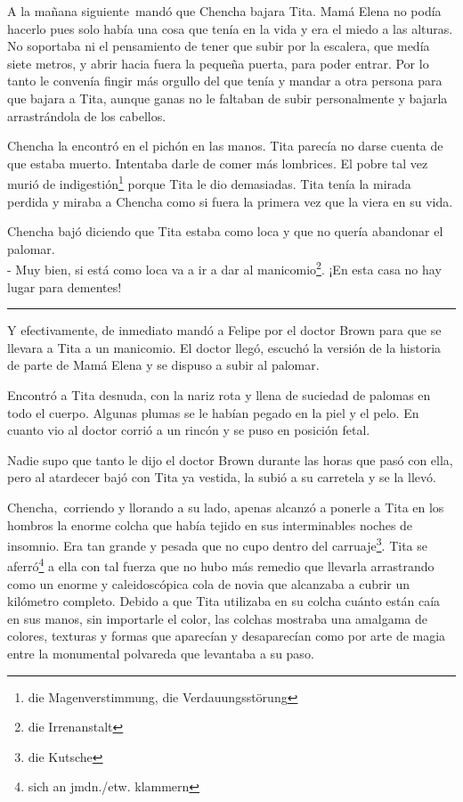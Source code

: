 A la mañana siguiente~mandó que Chencha bajara Tita. Mamá Elena
no podía hacerlo pues solo había una cosa que tenía en la vida y era el
miedo a las alturas. No soportaba ni el pensamiento de tener que subir
por la escalera, que medía siete metros, y abrir hacia fuera la pequeña
puerta, para poder entrar. Por lo tanto le convenía fingir más orgullo
del que tenía y mandar a otra persona para que bajara a Tita, aunque
ganas no le faltaban de subir personalmente y bajarla arrastrándola de
los cabellos.

Chencha la encontró en el pichón en las manos. Tita parecía no darse
cuenta de que estaba muerto. Intentaba darle de comer más lombrices. El
pobre tal vez murió de indigestión\footnote{die Magenverstimmung, die Verdauungsstörung}
porque Tita le dio demasiadas. Tita tenía la mirada perdida y miraba a
Chencha como si fuera la primera vez que la viera en su vida.

Chencha bajó diciendo que Tita estaba como loca y que no quería
abandonar el palomar.
\\- Muy bien, si está como loca va a ir a dar al manicomio\footnote{die Irrenanstalt}. %
¡En esta casa no hay lugar para dementes! \\
\rule{1em}{0pt}Y efectivamente, de inmediato
mandó a Felipe por el doctor Brown para que se llevara a Tita a un manicomio.
El doctor llegó, escuchó la versión de la historia de parte de Mamá Elena y se
dispuso a subir al palomar.

Encontró a Tita desnuda, con la nariz rota y llena de suciedad de
palomas en todo el cuerpo. Algunas plumas se le habían pegado en la piel
y el pelo. En cuanto vio al doctor corrió a un rincón y se puso en posición
fetal.

Nadie supo que tanto le dijo el doctor Brown durante las horas que pasó
con ella, pero al atardecer bajó con Tita ya vestida, la subió a su
carretela y se la llevó.

Chencha,~corriendo y llorando a su lado, apenas alcanzó a ponerle
a Tita en los hombros la enorme colcha que había tejido en sus
interminables noches de insomnio. Era tan grande y pesada que no cupo
dentro del carruaje\footnote{die Kutsche}. Tita se aferró\footnote{sich an jmdn./etw. klammern}
a ella con tal fuerza que no hubo más remedio que llevarla arrastrando
como un enorme y caleidoscópica cola de novia que alcanzaba a cubrir
un kilómetro completo. Debido a que Tita utilizaba en su colcha cuánto
están caía en sus manos, sin importarle el color, las colchas mostraba
una amalgama de colores, texturas y formas que aparecían y desaparecían
como por arte de magia entre la monumental polvareda que levantaba a su
paso.

